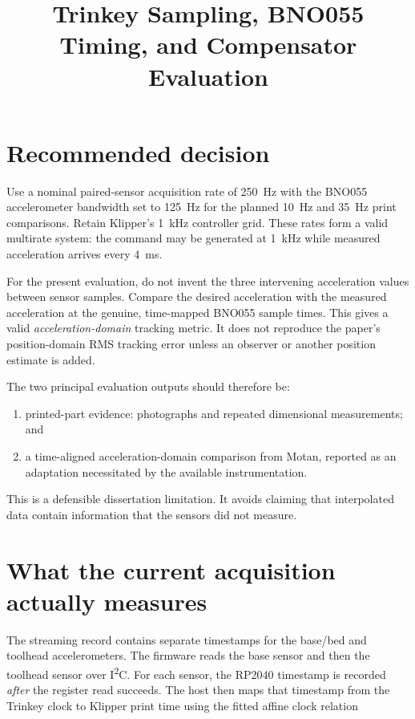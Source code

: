 \documentclass[11pt,a4paper]{article}
\title{Trinkey Sampling, BNO055 Timing, and Compensator Evaluation}
\author{}
\date{}
\begin{document}
\maketitle

\section{Recommended decision}

Use a nominal paired-sensor acquisition rate of \SI{250}{Hz} with the BNO055
accelerometer bandwidth set to \SI{125}{Hz} for the planned \SI{10}{Hz} and
\SI{35}{Hz} print comparisons.  Retain Klipper's \SI{1}{kHz} controller grid.
These rates form a valid multirate system: the command may be generated at
\SI{1}{kHz} while measured acceleration arrives every \SI{4}{ms}.

For the present evaluation, do not invent the three intervening acceleration
values between sensor samples.  Compare the desired acceleration with the
measured acceleration at the genuine, time-mapped BNO055 sample times.  This
gives a valid \emph{acceleration-domain} tracking metric.  It does not reproduce
the paper's position-domain RMS tracking error unless an observer or another
position estimate is added.

The two principal evaluation outputs should therefore be:

\begin{enumerate}
    \item printed-part evidence: photographs and repeated dimensional
    measurements; and
    \item a time-aligned acceleration-domain comparison from Motan, reported as
    an adaptation necessitated by the available instrumentation.
\end{enumerate}

This is a defensible dissertation limitation.  It avoids claiming that
interpolated data contain information that the sensors did not measure.

\section{What the current acquisition actually measures}

The streaming record contains separate timestamps for the base/bed and
toolhead accelerometers.  The firmware reads the base sensor and then the
toolhead sensor over I\textsuperscript{2}C.  For each sensor, the RP2040
timestamp is recorded \emph{after} the register read succeeds.  The host then
maps that timestamp from the Trinkey clock to Klipper print time using the
fitted affine clock relation
\end{document}
